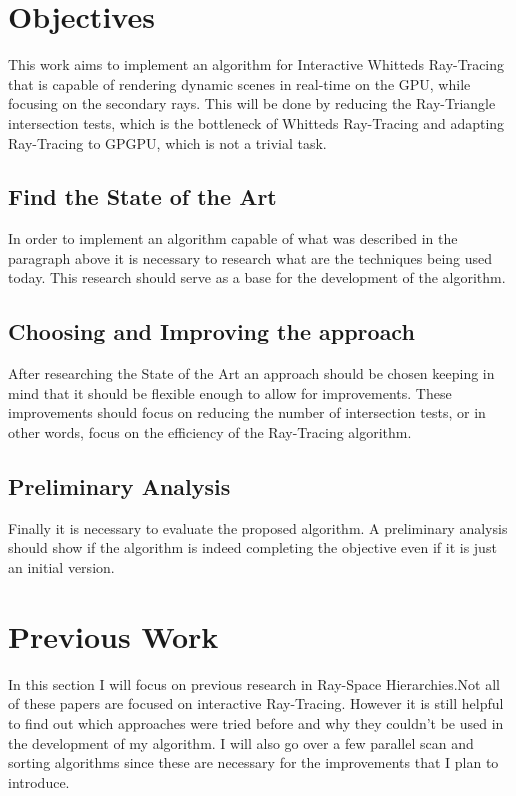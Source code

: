 \documentclass{llncs}
\begin{document}
%
\section{Objectives}
%

This work aims to implement an algorithm for Interactive Whitteds Ray-Tracing that is capable of rendering dynamic scenes in real-time on the GPU, while focusing on the secondary rays. This will be done by reducing the Ray-Triangle intersection tests, which is the bottleneck of Whitteds Ray-Tracing and adapting Ray-Tracing to GPGPU, which is not a trivial task.

%
\subsection{Find the State of the Art}
%

In order to implement an algorithm capable of what was described in the paragraph above it is necessary to research what are the techniques being used today. This research should serve as a base for the development of the algorithm.

%
\subsection{Choosing and Improving the approach}
%

After researching the State of the Art an approach should be chosen keeping in mind that it should be flexible enough to allow for improvements. These improvements should focus on reducing the number of intersection tests, or in other words, focus on the efficiency of the Ray-Tracing algorithm.

%
\subsection{Preliminary Analysis}
%

Finally it is necessary to evaluate the proposed algorithm. A preliminary analysis should show if the algorithm is indeed completing the objective even if it is just an initial version.

\newpage

%
\section{Previous Work}
%

In this section I will focus on previous research in Ray-Space Hierarchies.Not all of these papers are focused on interactive Ray-Tracing. However it is still helpful to find out which approaches were tried before and why they couldn't be used in the development of my algorithm. I will also go over a few parallel scan and sorting algorithms since these are necessary for the improvements that I plan to introduce.
\end{document}
